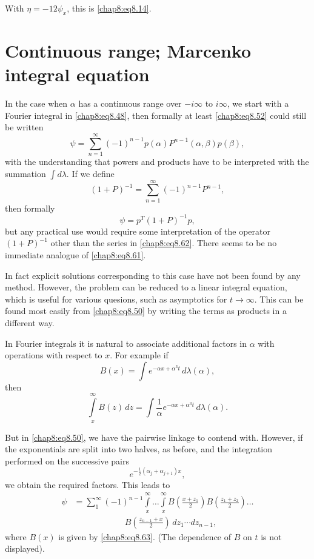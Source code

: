 With $\eta =-12\psi_x$, this is \eqref{chap8:eq8.14}.

\section{Continuous range; Marcenko integral equation}\label{chap8:sec8.6}\pageoriginale

In the case when $\alpha$ has a continuous range over $-i\infty$ to $i\infty$, \ie we start with a Fourier integral in \eqref{chap8:eq8.48}, then formally at least \eqref{chap8:eq8.52} could still be written
$$
\psi=\sum\limits_{n=1}^\infty (-1)^{n-1}p(\alpha)P^{n-1}(\alpha,\beta)p(\beta),
$$
with the understanding that powers and products have to be interpreted with the summation $\int d\lambda$. If we define
\begin{equation}
(1+P)^{-1}=\sum\limits_{n=1}^\infty(-1)^{n-1}P^{n-1}, \tag{8.62}\label{chap8:eq8.62}
\end{equation}
then formally
$$
\psi=p^T(1+P)^{-1}p,
$$
but any practical use would require some interpretation of the operator $(1+P)^{-1}$ other than the series in \eqref{chap8:eq8.62}. There seems to be no immediate analogue of \eqref{chap8:eq8.61}.

In fact explicit solutions corresponding to this case have not been found by any method. However, the problem can be reduced to a linear integral equation, which is useful for various quesions, such as asymptotics for $t\to\infty$. This can be found most easily from \eqref{chap8:eq8.50} by writing the terms as products in a different way.

In Fourier integrals it is natural to associate additional factors in $\alpha$ with operations with respect to $x$. For example if 
\begin{equation}
B(x)=\int e^{-\alpha x+\alpha^3 t}\,d\lambda(\alpha),\tag{8.63}\label{chap8:eq8.63}
\end{equation}
then
$$
\int\limits_x^\infty B(z)\,dz=\int\frac{1}{\alpha}e^{-\alpha x+\alpha^3 t}\,d\lambda (\alpha).
$$\pageoriginale

But in \eqref{chap8:eq8.50}, we have the pairwise linkage to contend with. However, if the exponentials are split into two halves, as before, and the integration performed on the successive pairs
$$
e^{-\frac{1}{2}\left(\alpha_j+\alpha_{j+1}\right)x},
$$
we obtain the required factors. This leads to 
\begin{align}
\psi&=\sum\limits_1^\infty(-1)^{n-1}\int\limits_x^\infty \ldots
\int\limits_x^\infty
B\left(\frac{x+z_1}{2}\right)B\left(\frac{z_1+z_2}{2}\right)\ldots\nonumber\\
&\qquad\qquad\qquad B\left(\frac{z_{n-1}+x}{2}\right)\,dz_1\cdots dz_{n-1},
\tag{8.64}\label{chap8:eq8.64} 
\end{align}
where $B(x)$ is given by \eqref{chap8:eq8.63}. (The dependence of $B$ on $t$ is not displayed).

